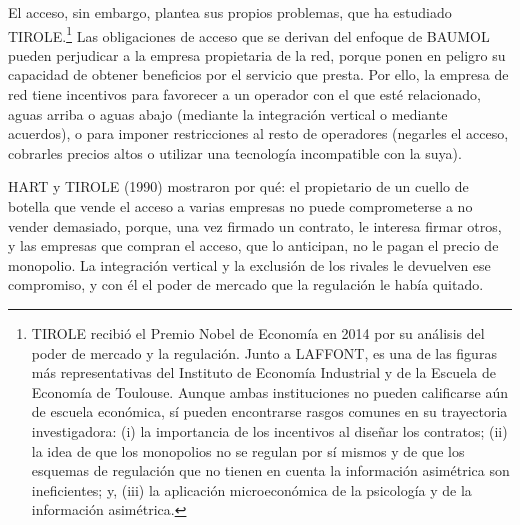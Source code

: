 \documentclass[10pt,a4paper]{article}
\begin{document}
El acceso, sin embargo, plantea sus propios problemas, que ha estudiado TIROLE.\footnote{%
    TIROLE recibió el Premio Nobel de Economía en 2014 por su análisis del poder de mercado y la regulación. Junto a LAFFONT, es una de las figuras más representativas del Instituto de Economía Industrial y de la Escuela de Economía de Toulouse. Aunque ambas instituciones no pueden calificarse aún de escuela económica, sí pueden encontrarse rasgos comunes en su trayectoria investigadora: (i) la importancia de los incentivos al diseñar los contratos; (ii) la idea de que los monopolios no se regulan por sí mismos y de que los esquemas de regulación que no tienen en cuenta la información asimétrica son ineficientes; y, (iii) la aplicación microeconómica de la psicología y de la información asimétrica.
} Las obligaciones de acceso que se derivan del enfoque de BAUMOL pueden perjudicar a la empresa propietaria de la red, porque ponen en peligro su capacidad de obtener beneficios por el servicio que presta. Por ello, la empresa de red tiene incentivos para favorecer a un operador con el que esté relacionado, aguas arriba o aguas abajo (mediante la integración vertical o mediante acuerdos), o para imponer restricciones al resto de operadores (negarles el acceso, cobrarles precios altos o utilizar una tecnología incompatible con la suya). 

HART y TIROLE (1990) mostraron por qué: el propietario de un cuello de botella que vende el acceso a varias empresas no puede comprometerse a no vender demasiado, porque, una vez firmado un contrato, le interesa firmar otros, y las empresas que compran el acceso, que lo anticipan, no le pagan el precio de monopolio. La integración vertical y la exclusión de los rivales le devuelven ese compromiso, y con él el poder de mercado que la regulación le había quitado.
\end{document}
